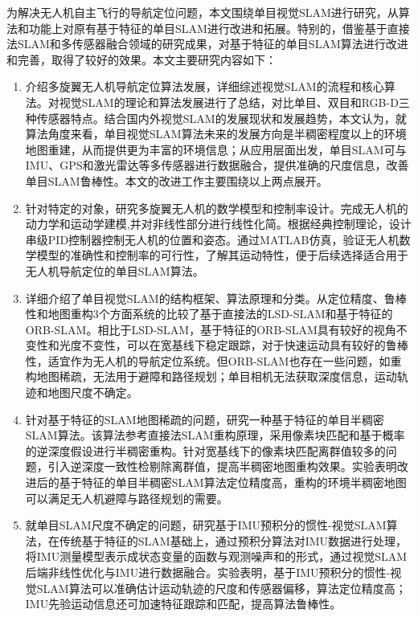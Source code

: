 


\begin{conclusion}
为解决无人机自主飞行的导航定位问题，本文围绕单目视觉SLAM进行研究，从算法和功能上对原有基于特征的单目SLAM进行改进和拓展。特别的，借鉴基于直接法SLAM和多传感器融合领域的研究成果，对基于特征的单目SLAM算法进行改进和完善，取得了较好的效果。本文主要研究内容如下：
\begin{enumerate}  [label={(\arabic*)}]
\item 介绍多旋翼无人机导航定位算法发展，详细综述视觉SLAM的流程和核心算法。对视觉SLAM的理论和算法发展进行了总结，对比单目、双目和RGB-D三种传感器特点。结合国内外视觉SLAM的发展现状和发展趋势，本文认为，就算法角度来看，单目视觉SLAM算法未来的发展方向是半稠密程度以上的环境地图重建，从而提供更为丰富的环境信息；从应用层面出发，单目SLAM可与IMU、GPS和激光雷达等多传感器进行数据融合，提供准确的尺度信息，改善单目SLAM鲁棒性。本文的改进工作主要围绕以上两点展开。
\item 针对特定的对象，研究多旋翼无人机的数学模型和控制率设计。完成无人机的动力学和运动学建模,并对非线性部分进行线性化简。根据经典控制理论，设计串级PID控制器控制无人机的位置和姿态。通过MATLAB仿真，验证无人机数学模型的准确性和控制率的可行性，了解其运动特性，便于后续选择适合用于无人机导航定位的单目SLAM算法。
\item 详细介绍了单目视觉SLAM的结构框架、算法原理和分类。从定位精度、鲁棒性和地图重构3个方面系统的比较了基于直接法的LSD-SLAM和基于特征的ORB-SLAM。相比于LSD-SLAM，基于特征的ORB-SLAM具有较好的视角不变性和光度不变性，可以在宽基线下稳定跟踪，对于快速运动具有较好的鲁棒性，适宜作为无人机的导航定位系统。但ORB-SLAM也存在一些问题，如重构地图稀疏，无法用于避障和路径规划；单目相机无法获取深度信息，运动轨迹和地图尺度不确定。
\item 针对基于特征的SLAM地图稀疏的问题，研究一种基于特征的单目半稠密SLAM算法。该算法参考直接法SLAM重构原理，采用像素块匹配和基于概率的逆深度假设进行半稠密重构。针对宽基线下的像素块匹配离群值较多的问题，引入逆深度一致性检剔除离群值，提高半稠密地图重构效果。实验表明改进后的基于特征的单目半稠密SLAM算法定位精度高，重构的环境半稠密地图可以满足无人机避障与路径规划的需要。
\item 就单目SLAM尺度不确定的问题，研究基于IMU预积分的惯性-视觉SLAM算法，在传统基于特征的SLAM基础上，通过预积分算法对IMU数据进行处理，将IMU测量模型表示成状态变量的函数与观测噪声和的形式，通过视觉SLAM后端非线性优化与IMU进行数据融合。实验表明，基于IMU预积分的惯性-视觉SLAM算法可以准确估计运动轨迹的尺度和传感器偏移，算法定位精度高；IMU先验运动信息还可加速特征跟踪和匹配，提高算法鲁棒性。
\end{enumerate}


\end{conclusion}
